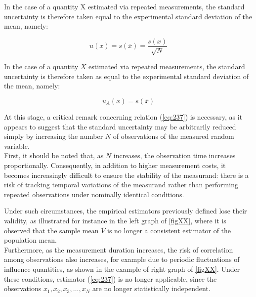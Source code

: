 \documentclass[../main.tex]{subfiles}
\begin{document}
In the case of a quantity X estimated via repeated measurements, the standard uncertainty is therefore taken equal to the experimental standard deviation of the mean, namely:

\begin{equation}
	u(x) = s(\overline{x}) = \frac{s(x)}{\sqrt{N}}
\label{eq:237}
\end{equation}


In the case of a quantity $X$ estimated via repeated measurements, the standard uncertainty is therefore taken as equal to the experimental standard deviation of the mean, namely:

\begin{equation}
	u_A(x) = s(\overline{x})
\end{equation}

At this stage, a critical remark concerning relation (\autoref{eq:237}) is necessary, as it appears to suggest that the standard uncertainty may be arbitrarily reduced simply by increasing the number $N$ of observations of the measured random variable.\\

First, it should be noted that, as $N$ increases, the observation time increases proportionally. 
Consequently, in addition to higher measurement costs, it becomes increasingly difficult to ensure the stability of the measurand: there is a risk of tracking temporal variations of the measurand rather than performing repeated observations under nominally identical conditions. 

Under such circumstances, the empirical estimators previously defined lose their validity, as illustrated for instance in the left graph of \autoref{figXX}, where it is observed that the sample mean $\overline{V}$ is no longer a consistent estimator of the population mean.\\

Furthermore, as the measurement duration increases, the risk of correlation among observations also increases, for example due to periodic fluctuations of influence quantities, as shown in the example of right graph of \autoref{figXX}. Under these conditions, estimator (\autoref{eq:237}) is no longer applicable, since the observations $x_1, x_2, x_3, \dots, x_N$ are no longer statistically independent.\\
\end{document}
